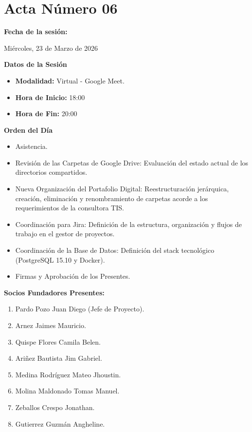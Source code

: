 \newpage
\section{Acta Número 06}
\label{sec:acta06}

\noindent \textbf{Fecha de la sesión:}\par
Miércoles, 23 de Marzo de 2026

\vspace*{0.5cm}
\noindent \textbf{Datos de la Sesión}
\vspace{-0.2cm}
\begin{itemize}[noitemsep]
    \item \textbf{Modalidad:} Virtual - Google Meet.
    \item \textbf{Hora de Inicio:} 18:00
    \item \textbf{Hora de Fin:} 20:00
\end{itemize}

\vspace*{0.5cm}
\noindent \textbf{Orden del Día}
\vspace{-0.2cm}
\begin{itemize}[noitemsep]
    \item Asistencia.
    \item Revisión de las Carpetas de Google Drive: Evaluación del estado actual de los directorios compartidos.
    \item Nueva Organización del Portafolio Digital: Reestructuración jerárquica, creación, eliminación y renombramiento de carpetas acorde a los requerimientos de la consultora TIS.
    \item Coordinación para Jira: Definición de la estructura, organización y flujos de trabajo en el gestor de proyectos.
    \item Coordinación de la Base de Datos: Definición del stack tecnológico (PostgreSQL 15.10 y Docker).
    \item Firmas y Aprobación de los Presentes.
\end{itemize}

\vspace*{0.5cm}
\noindent \textbf{Socios Fundadores Presentes:}
\vspace{-0.2cm}
\begin{enumerate}[noitemsep]
    \item Pardo Pozo Juan Diego (Jefe de Proyecto).
    \item Arnez Jaimes Mauricio.
    \item Quispe Flores Camila Belen.
    \item Ariñez Bautista Jim Gabriel.
    \item Medina Rodríguez Mateo Jhoustin.
    \item Molina Maldonado Tomas Manuel.
    \item Zeballos Crespo Jonathan.
    \item Gutierrez Guzmán Angheline.
\end{enumerate}

